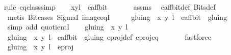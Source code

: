 \begin{isabellebody}
%
\isatagproof
{}\isamarkupfalse%
{\isacharparenleft}rule\ eq{\isacharunderscore}class{\isacharunderscore}simp{\isacharparenright}\isanewline
\ \ \isamarkupfalse%
\ {\isachardoublequoteopen}{\isacharparenleft}{\isacharparenleft}x{\isacharcomma}y{\isacharparenright}{\isacharcomma}l{\isacharparenright}\ {\isasymin}\ e{\isacharunderscore}aff{\isacharunderscore}bit{\isachardoublequoteclose}\ \isanewline
\ \ \ \ \isamarkupfalse%
\ assms\ \isamarkupfalse%
\ e{\isacharunderscore}aff{\isacharunderscore}bit{\isacharunderscore}def\ Bits{\isacharunderscore}def\ \isanewline
\ \ \ \ \isamarkupfalse%
\ {\isacharparenleft}metis\ Bit{\isacharunderscore}cases\ SigmaI\ image{\isacharunderscore}eqI{\isacharparenright}\isanewline
\ \ \isamarkupfalse%
\ \isamarkupfalse%
\ {\isachardoublequoteopen}gluing\ {\isacharbackquote}{\isacharbackquote}\ {\isacharbraceleft}{\isacharparenleft}{\isacharparenleft}x{\isacharcomma}\ y{\isacharparenright}{\isacharcomma}\ l{\isacharparenright}{\isacharbraceright}\ {\isasymin}\ e{\isacharunderscore}aff{\isacharunderscore}bit\ {\isacharslash}{\isacharslash}\ gluing{\isachardoublequoteclose}\isanewline
\ \ \ \ \isamarkupfalse%
\ {\isacharparenleft}simp\ add{\isacharcolon}\ quotientI{\isacharparenright}\isanewline
\ \ \isamarkupfalse%
\ {\isachardoublequoteopen}gluing\ {\isacharbackquote}{\isacharbackquote}\ {\isacharbraceleft}{\isacharparenleft}{\isacharparenleft}x{\isacharcomma}\ y{\isacharparenright}{\isacharcomma}\ l{\isacharparenright}{\isacharbraceright}\ {\isasymnoteq}\ {\isacharbraceleft}{\isacharbraceright}{\isachardoublequoteclose}\ \isanewline
\ \ \ \ \isamarkupfalse%
\ {\isacartoucheopen}gluing\ {\isacharbackquote}{\isacharbackquote}\ {\isacharbraceleft}{\isacharparenleft}{\isacharparenleft}x{\isacharcomma}\ y{\isacharparenright}{\isacharcomma}\ l{\isacharparenright}{\isacharbraceright}\ {\isasymin}\ e{\isacharunderscore}aff{\isacharunderscore}bit\ {\isacharslash}{\isacharslash}\ gluing{\isacartoucheclose}\ e{\isacharunderscore}proj{\isacharunderscore}def\ e{\isacharunderscore}proj{\isacharunderscore}eq\ \isanewline
\ \ \ \ \isamarkupfalse%
\ fastforce\isanewline
\ \ \isamarkupfalse%
\ {\isachardoublequoteopen}gluing\ {\isacharbackquote}{\isacharbackquote}\ {\isacharbraceleft}{\isacharparenleft}{\isacharparenleft}x{\isacharcomma}\ y{\isacharparenright}{\isacharcomma}\ l{\isacharparenright}{\isacharbraceright}\ {\isasymin}\ e{\isacharunderscore}proj{\isachardoublequoteclose}\isanewline

\end{isabellebody}

